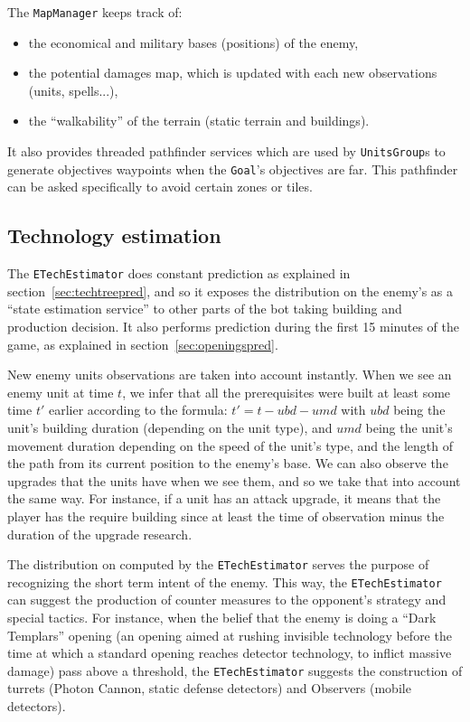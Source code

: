 The \texttt{MapManager} keeps track of:
\begin{itemize}
    \item the economical and military bases (positions) of the enemy, 
    \item the potential damages map, which is updated with each new observations (units, spells...),
    \item the ``walkability'' of the terrain (static terrain and buildings).
\end{itemize}
It also provides threaded pathfinder services which are used by \texttt{UnitsGroup}s to generate objectives waypoints when the \texttt{Goal}'s objectives are far. This pathfinder can be asked specifically to avoid certain zones or tiles.

\subsection{Technology estimation}

The \texttt{ETechEstimator} does constant  prediction as explained in section~\ref{sec:techtreepred}, and so it exposes the distribution on the enemy's  as a ``state estimation service'' to other parts of the bot taking building and production decision. It also performs  prediction during the first 15 minutes of the game, as explained in section~\ref{sec:openingspred}. 

New enemy units observations are taken into account instantly. When we see an enemy unit at time $t$, we infer that all the prerequisites were built at least some time $t'$ earlier according to the formula:
$t' = t - ubd - umd$
with $ubd$ being the unit's building duration (depending on the unit type), and $umd$ being the unit's movement duration depending on the speed of the unit's type, and the length of the path from its current position to the enemy's base. We can also observe the upgrades that the units have when we see them, and so we take that into account the same way. For instance, if a unit has an attack upgrade, it means that the player has the require building since at least the time of observation minus the duration of the upgrade research.

The distribution on  computed by the \texttt{ETechEstimator} serves the purpose of recognizing the short term intent of the enemy. This way, the \texttt{ETechEstimator} can suggest the production of counter measures to the opponent's strategy and special tactics. For instance, when the belief that the enemy is doing a ``Dark Templars'' opening (an opening aimed at rushing invisible technology before the time at which a standard opening reaches detector technology, to inflict massive damage) pass above a threshold, the \texttt{ETechEstimator} suggests the construction of turrets (Photon Cannon, static defense detectors) and Observers (mobile detectors).

